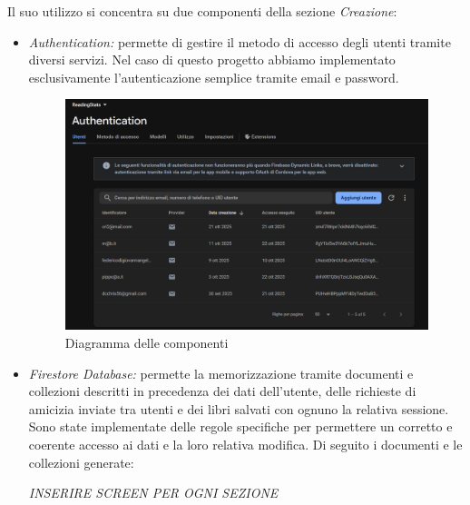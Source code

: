 \documentclass{article}
\begin{document}
Il suo utilizzo si concentra su due componenti della sezione \textit{Creazione}:
\begin{itemize}
  \item \textit{Authentication:} permette di gestire il metodo di accesso degli utenti tramite diversi servizi. Nel caso di questo progetto abbiamo implementato esclusivamente l'autenticazione semplice tramite email e password.
    \begin{figure}[H]
    \centering
    \includegraphics[width=1\linewidth]{authentication.png}
    \caption{Diagramma delle componenti}
    \label{fig:sitemap}
  \end{figure}
  \item \textit{Firestore Database:} permette la memorizzazione tramite documenti e collezioni descritti in precedenza dei dati dell'utente, delle richieste di amicizia inviate tra utenti e dei libri salvati con ognuno la relativa sessione. 
  Sono state implementate delle regole specifiche per permettere un corretto e coerente accesso ai dati e la loro relativa modifica. Di seguito i documenti e le collezioni generate:
  
  \textit{INSERIRE SCREEN PER OGNI SEZIONE}


\end{itemize}
\end{document}
